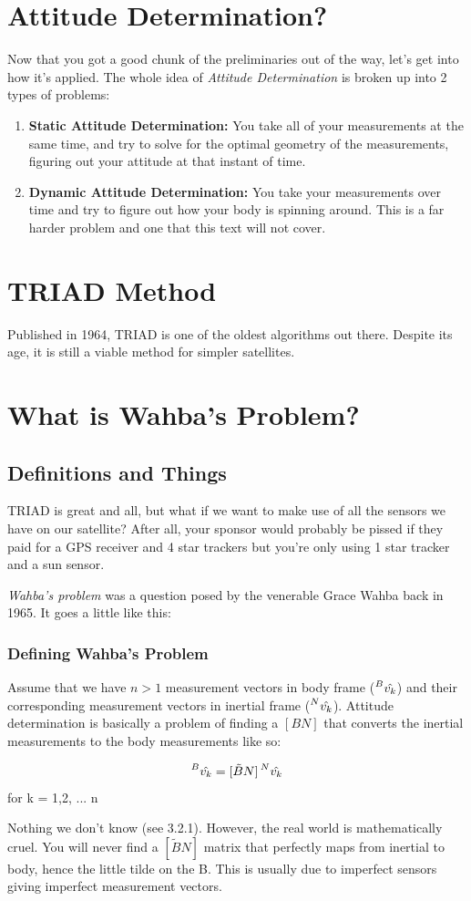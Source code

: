 \documentclass[a4paper,14pt]{extreport}
\newcommand{\vk}[1]{\prescript{#1}{}{\hat{v_k}}}
\begin{document}
\chapter{Attitude Determination?}
Now that you got a good chunk of the preliminaries out of the way, let's get into how it's applied. The whole idea of \emph{Attitude Determination} is broken up into 2 types of problems:
\begin{enumerate}
\item{
\textbf{Static Attitude Determination:} You take all of your measurements at the same time, and try to solve for the optimal geometry of the measurements, figuring out your attitude at that instant of time.
}
\item{\textbf{Dynamic Attitude Determination:} You take your measurements over time and try to figure out how your body is spinning around. This is a far harder problem and one that this text will not cover.
}
\end{enumerate}


\chapter{TRIAD Method}
Published in 1964, TRIAD is one of the oldest algorithms out there. Despite its age, it is still a viable method for simpler satellites.
\chapter{What is Wahba's Problem?}
\section{Definitions and Things}
TRIAD is great and all, but what if we want to make use of all the sensors we have on our satellite? After all, your sponsor would probably be pissed if they paid for a GPS receiver and 4 star trackers but you're only using 1 star tracker and a sun sensor.

\emph{Wahba's problem} was a question posed by the venerable Grace Wahba back in 1965. It goes a little like this:
\subsection{Defining Wahba's Problem}
Assume that we have $n>1$ measurement vectors in body frame ($\vk{B}$) and their corresponding measurement vectors in inertial frame ($\vk{N}$). Attitude determination is basically a problem of finding a $[BN]$ that converts the inertial measurements to the body measurements like so:
\begin{center}
\[
\vk{B}= [\tilde{B}N]\vk{N}
\]
for k = 1,2, ... n
\end{center}
Nothing we don't know (see 3.2.1). However, the real world is mathematically cruel. You will never find a $[\tilde{B}N]$ matrix that perfectly maps from inertial to body, hence the little tilde on the B. This is usually due to imperfect sensors giving imperfect measurement vectors. 
\end{document}
